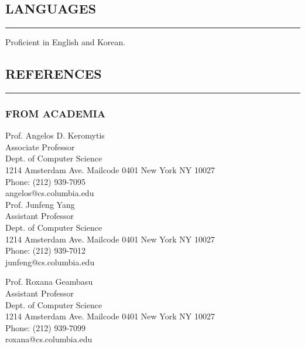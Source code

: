 \documentclass[10pt,a4]{article}
\begin{document}
\begin{small}
\subsection*{LANGUAGES}
\hrule
\vspace{0.2cm}
\begin{list}{}{}
	\item  Proficient in English and Korean.
\end{list}


\vspace{0.1cm}

\subsection*{REFERENCES}
\hrule
\vspace{0.2cm}

\subsubsection*{FROM ACADEMIA}
\begin{footnotesize}

\begin{multicols}{2} 
\noindent 
Prof. Angelos D. Keromytis \\
Associate Professor \\
Dept. of Computer Science \\
1214 Amsterdam Ave. Mailcode 0401
New York NY 10027 \\
Phone: (212) 939-7095 \\
angelos@cs.columbia.edu \\

\noindent
Prof. Junfeng Yang\\
Assistant Professor \\
Dept. of Computer Science \\
1214 Amsterdam Ave. Mailcode 0401
New York NY 10027 \\
Phone: (212) 939-7012 \\
junfeng@cs.columbia.edu \\
\columnbreak

\noindent
Prof. Roxana Geambasu\\
Assistant Professor \\
Dept. of Computer Science \\
1214 Amsterdam Ave. Mailcode 0401
New York NY 10027 \\
Phone: (212) 939-7099 \\
roxana@cs.columbia.edu \\


\end{multicols}
\end{footnotesize}
\end{small}
\end{document}
